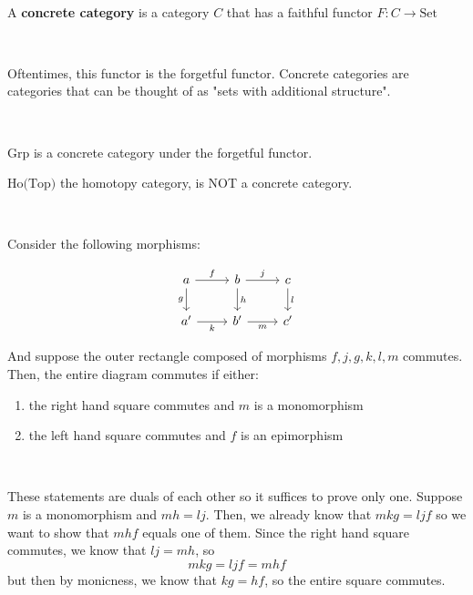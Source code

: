 \documentclass{article}
\begin{document}
\begin{definition}
\

A \textbf{concrete category} is a category $C$ that has a faithful functor $F: C \to \text{Set}$ 
\end{definition}

\begin{remark}
\

Oftentimes, this functor is the forgetful functor. Concrete categories are categories that can be thought of as "sets with additional structure".
\end{remark}

\begin{example}
\

$\text{Grp}$ is a concrete category under the forgetful functor.

$\text{Ho(Top)}$ the homotopy category, is NOT a concrete category.
\end{example}

\begin{lemma}
\

Consider the following morphisms:

\[\begin{tikzcd}
    a & b & c\\
    a' & b' & c'
    \arrow[from=1-1,to=1-2, "f"]
    \arrow[from=1-2,to=1-3, "j"]
    \arrow[from=1-3, to=2-3, "l"]
    \arrow[from=1-1, to=2-1, "g"']
    \arrow[from=2-1, to=2-2, "k"']
    \arrow[from=2-2, to=2-3, "m"']
    \arrow[from=1-2, to=2-2, "h"]
\end{tikzcd}\]

And suppose the outer rectangle composed of morphisms $f, j, g, k, l, m$ commutes. Then, the entire diagram commutes if either: \begin{enumerate}
    \item the right hand square commutes and $m$ is a monomorphism
    \item the left hand square commutes and $f$ is an epimorphism
\end{enumerate}
\end{lemma}

\begin{customproof}
\

These statements are duals of each other so it suffices to prove only one. Suppose $m$ is a monomorphism and $mh = lj$. Then, we already know that $mkg = ljf$ so we want to show that $mhf$ equals one of them. Since the right hand square commutes, we know that $lj = mh$, so $$mkg = ljf = mhf$$but then by monicness, we know that $kg = hf$, so the entire square commutes.
\end{customproof}
\end{document}
